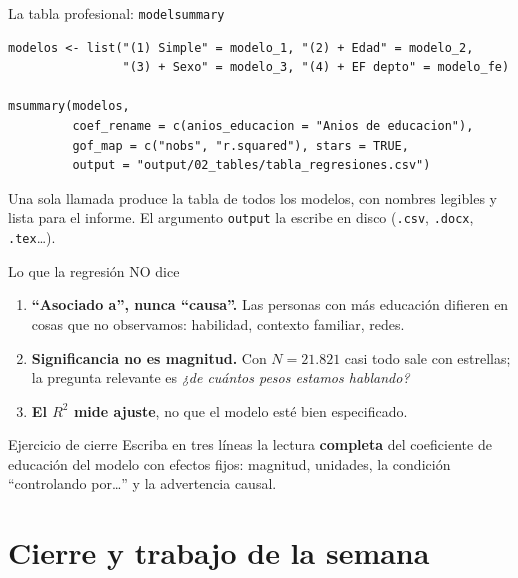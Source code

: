 \documentclass[10pt]{beamer}
\begin{document}
\begin{frame}[fragile]{La tabla profesional: \texttt{modelsummary}}
\begin{lstlisting}
modelos <- list("(1) Simple" = modelo_1, "(2) + Edad" = modelo_2,
                "(3) + Sexo" = modelo_3, "(4) + EF depto" = modelo_fe)

msummary(modelos,
         coef_rename = c(anios_educacion = "Anios de educacion"),
         gof_map = c("nobs", "r.squared"), stars = TRUE,
         output = "output/02_tables/tabla_regresiones.csv")
\end{lstlisting}
  \small Una sola llamada produce la tabla de todos los modelos, con nombres legibles y lista para el informe. El argumento \texttt{output} la escribe en disco (\texttt{.csv}, \texttt{.docx}, \texttt{.tex}\ldots).
\end{frame}

\begin{frame}{Lo que la regresión NO dice}
  \begin{enumerate}\setlength\itemsep{0.8em}
    \item \textbf{``Asociado a'', nunca ``causa''.} Las personas con más educación difieren en cosas que no observamos: habilidad, contexto familiar, redes.
    \item \textbf{Significancia no es magnitud.} Con $N = 21.821$ casi todo sale con estrellas; la pregunta relevante es \emph{¿de cuántos pesos estamos hablando?}
    \item \textbf{El $R^2$ mide ajuste}, no que el modelo esté bien especificado.
  \end{enumerate}
  \bigskip
  \begin{block}{Ejercicio de cierre}
    Escriba en tres líneas la lectura \textbf{completa} del coeficiente de educación del modelo con efectos fijos: magnitud, unidades, la condición ``controlando por\ldots'' y la advertencia causal.
  \end{block}
\end{frame}

\section{Cierre y trabajo de la semana}
\end{document}
